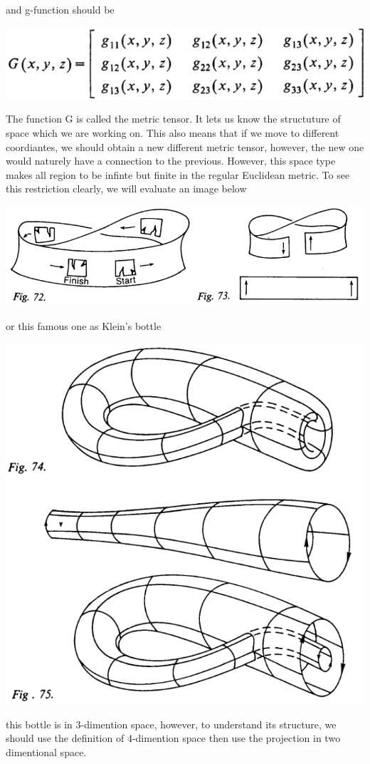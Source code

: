 \documentclass[11pt,a4paper]{article}
\begin{document}
	and g-function should be
	\begin{center}
	\includegraphics[scale=0.35]{./G3d.png}
	\end{center}
	The function G is called the metric tensor. It lets us know the structuture of space which we are working on. This also means that if we move to different coordiantes, we should obtain a new different metric tensor, however, the new one would naturely have a connection to the previous.
	However, this space type makes all region to be infinte but finite in the regular Euclidean metric. To see this restriction clearly, we will evaluate an image below
	\begin{center}
		\includegraphics[scale=0.35]{./finitebutinfinite.png}
	\end{center}
	or this famous one as Klein's bottle
	\begin{center}
		\includegraphics[scale=0.35]{./klei3d.png}
	\end{center}
	this bottle is in 3-dimention space, however, to understand its structure, we should use the definition of 4-dimention space then use the projection in two dimentional space.
\end{document}
